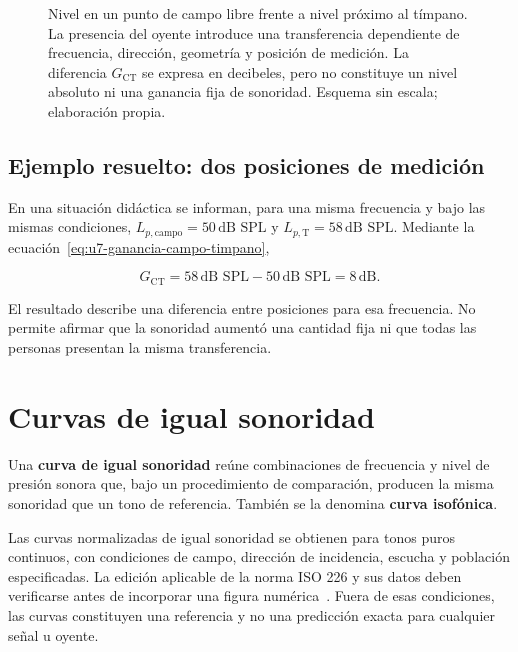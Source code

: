 \begin{figure}[htbp]
    \centering
    
    \caption{Nivel en un punto de campo libre frente a nivel próximo al
    tímpano. La presencia del oyente introduce una transferencia dependiente de
    frecuencia, dirección, geometría y posición de medición. La diferencia
    \(G_{\mathrm{CT}}\) se expresa en decibeles, pero no constituye un nivel
    absoluto ni una ganancia fija de sonoridad. Esquema sin escala; elaboración
    propia.}
    \label{fig:u7-campo-cae-timpano}
\end{figure}

\subsection{Ejemplo resuelto: dos posiciones de medición}
\label{sec:u7-ejemplo-campo-timpano}

En una situación didáctica se informan, para una misma frecuencia y bajo las
mismas condiciones, \(L_{p,\mathrm{campo}}=50\,\text{dB SPL}\) y
\(L_{p,\mathrm{T}}=58\,\text{dB SPL}\). Mediante la
ecuación~\eqref{eq:u7-ganancia-campo-timpano},

\[
    G_{\mathrm{CT}}
      =58\,\text{dB SPL}-50\,\text{dB SPL}
      =8\,\text{dB}.
\]

El resultado describe una diferencia entre posiciones para esa frecuencia.
No permite afirmar que la sonoridad aumentó una cantidad fija ni que todas las
personas presentan la misma transferencia.

\section{Curvas de igual sonoridad}
\label{sec:u7-isofonicas}

Una \textbf{curva de igual sonoridad} reúne combinaciones de frecuencia y
nivel de presión sonora que, bajo un procedimiento de comparación, producen
la misma sonoridad que un tono de referencia. También se la denomina
\textbf{curva isofónica}.

Las curvas normalizadas de igual sonoridad se obtienen para tonos
puros continuos, con condiciones de campo, dirección de incidencia, escucha y
población especificadas. La edición aplicable de la norma ISO 226 y sus datos
deben verificarse antes de incorporar una figura numérica~\cite{iso226_2023}. Fuera de esas
condiciones, las curvas constituyen una referencia y no una predicción exacta
para cualquier señal u oyente.

